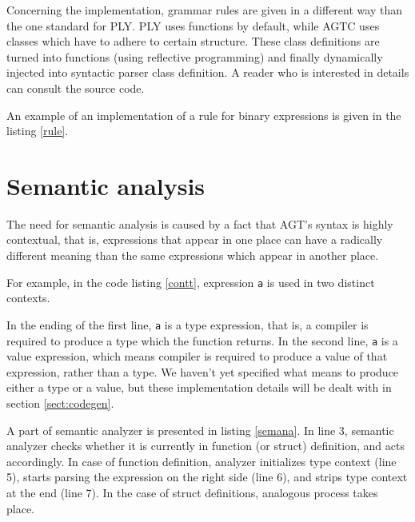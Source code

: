 \documentclass[times, utf8, diplomski]{fer}
\theoremstyle{definition}
\newcommand{\pythoncode}[3]{
    
}
\newcommand{\textcode}[3]{
    
}
\begin{document}
Concerning the implementation, grammar rules are given in a different way than the
one standard for PLY. PLY uses functions by default, while AGTC uses
classes which have to adhere to certain structure. These class definitions
are turned into functions (using reflective programming) and finally
dynamically injected into syntactic parser class definition.
A reader who is interested in details can consult the source code.

An example of an implementation of a rule for binary expressions is given in the listing \ref{rule}.
\\

\textcode{\resdir/compiler/rule.py}{rule}{Binary expression rule implementation}

\section{Semantic analysis}

The need for semantic analysis is caused by a fact that AGT's syntax is highly contextual,
that is, expressions that appear in one place can have a radically different meaning
than the same expressions which appear in another place.

For example, in the code listing \ref{contt}, expression \texttt{a} is used in two distinct contexts.

\textcode{\resdir/compiler/contextual.agt}{contt}{Contextuality of expression \texttt{a}}

In the ending of the first line, \texttt{a} is a type expression, that is, a
compiler is required to produce a type which the function returns. In the
second line, \texttt{a} is a value expression,
which means compiler is required to produce a value of that expression, rather than a type.
We haven't yet specified what means to produce either a type or a value, but these implementation
details will be dealt with in section \ref{sect:codegen}.

A part of semantic analyzer is presented in listing \ref{semana}.
In line 3, semantic analyzer checks whether it is currently in function (or struct) definition, 
and acts accordingly. In case of function definition, analyzer initializes type context (line 5),
starts parsing the expression on the right side (line 6), 
and strips type context at the end (line 7).
In the case of struct definitions, analogous process takes place.

\pythoncode{\resdir/compiler/initex.py}{semana}{Semantic analysis rule example}
\end{document}
